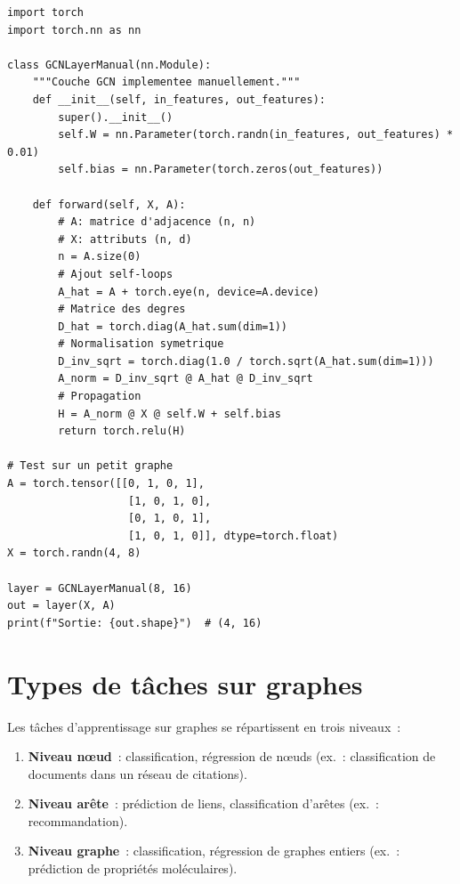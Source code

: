 \begin{codeblock}[title=\textbf{GCN impl\'ement\'ee from scratch}]
\begin{verbatim}
import torch
import torch.nn as nn

class GCNLayerManual(nn.Module):
    """Couche GCN implementee manuellement."""
    def __init__(self, in_features, out_features):
        super().__init__()
        self.W = nn.Parameter(torch.randn(in_features, out_features) * 0.01)
        self.bias = nn.Parameter(torch.zeros(out_features))

    def forward(self, X, A):
        # A: matrice d'adjacence (n, n)
        # X: attributs (n, d)
        n = A.size(0)
        # Ajout self-loops
        A_hat = A + torch.eye(n, device=A.device)
        # Matrice des degres
        D_hat = torch.diag(A_hat.sum(dim=1))
        # Normalisation symetrique
        D_inv_sqrt = torch.diag(1.0 / torch.sqrt(A_hat.sum(dim=1)))
        A_norm = D_inv_sqrt @ A_hat @ D_inv_sqrt
        # Propagation
        H = A_norm @ X @ self.W + self.bias
        return torch.relu(H)

# Test sur un petit graphe
A = torch.tensor([[0, 1, 0, 1],
                   [1, 0, 1, 0],
                   [0, 1, 0, 1],
                   [1, 0, 1, 0]], dtype=torch.float)
X = torch.randn(4, 8)

layer = GCNLayerManual(8, 16)
out = layer(X, A)
print(f"Sortie: {out.shape}")  # (4, 16)
\end{verbatim}
\end{codeblock}

\section{Types de t\^aches sur graphes}

\begin{definition}
Les t\^aches d'apprentissage sur graphes se r\'epartissent en trois niveaux~:
\begin{enumerate}
    \item \textbf{Niveau n\oe ud}~: classification, r\'egression de n\oe uds
          (ex.~: classification de documents dans un r\'eseau de citations).
    \item \textbf{Niveau ar\^ete}~: pr\'ediction de liens, classification d'ar\^etes
          (ex.~: recommandation).
    \item \textbf{Niveau graphe}~: classification, r\'egression de graphes entiers
          (ex.~: pr\'ediction de propri\'et\'es mol\'eculaires).
\end{enumerate}
\end{definition}

